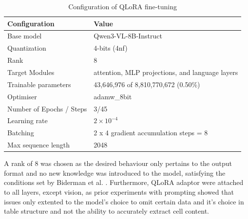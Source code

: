 \documentclass[ %
                    author={Natchalin Iwsakul \\ Inkaphol Siriwongwattana \\ Tanaphan Kummaraphat \\ Patorn Srisupap},
                supervisor={Fernando Moreno-Pino},
                    degree={MSc},
                     title={Propensity Modelling for SME Commercial Lending Using Open Public Data},
                  subtitle={Companies House filings and GDELT media coverage as predictors of first-time borrowing},
                      type={},
                      year={2026}]{dissertation}
\begin{document}
  \begin{table}[H]
    \centering
    \begin{tabular}{ll}
    \toprule
    Configuration & Value \\
    \midrule
    Base model      & 	Qwen3-VL-8B-Instruct \\
    Quantization    &   4-bits (4nf)    \\
    Rank & 8    \\
    Target Modules & attention, MLP projections, and language layers \\
    Trainable parameters    &   43,646,976 of 8,810,770,672 (0.50\%) \\
    Optimiser	& adamw\_8bit  \\
    Number of Epochs / Steps    & 3/45 \\
    Learning rate	& $2 \times 10^{-4}$ \\
    Batching    &  2 x 4 gradient accumulation steps = 8 \\
    Max sequence length &   2048 \\
    \bottomrule
    \end{tabular}
    \caption[]{Configuration of QLoRA fine-tuning}
    \label{tab:windows}
    \end{table}
  
    A rank of 8 was chosen as the desired behaviour only pertains to the output format and no new knowledge was introduced to the model, satisfying the conditions set by Biderman et al. \cite{biderman2024lora}. Furthermore, QLoRA adaptor were attached to all layers, except vision, as prior experiments with prompting showed that issues only extented to the model's choice to omit certain data and it's choice in table structure and not the ability to accurately extract cell content. 

    
\end{document}
